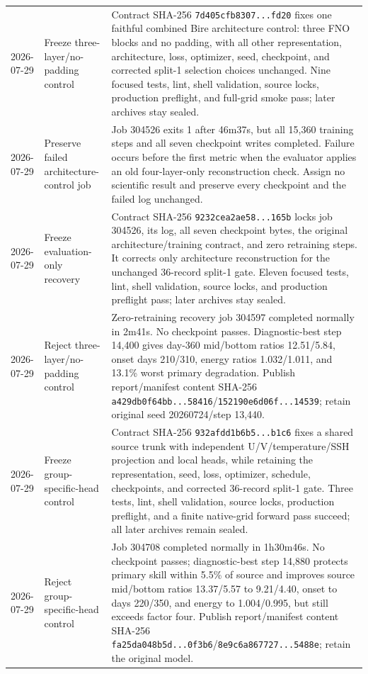 \documentclass[11pt]{article}
\begin{document}
\begin{longtable}{@{}p{}p{}p{}@{}}
2026-07-29 & Freeze three-layer/no-padding control & Contract SHA-256 \texttt{7d405cfb8307...fd20} fixes one faithful combined Bire architecture control: three FNO blocks and no padding, with all other representation, architecture, loss, optimizer, seed, checkpoint, and corrected split-1 selection choices unchanged.  Nine focused tests, lint, shell validation, source locks, production preflight, and full-grid smoke pass; later archives stay sealed. \\
2026-07-29 & Preserve failed architecture-control job & Job 304526 exits 1 after 46m37s, but all 15,360 training steps and all seven checkpoint writes completed.  Failure occurs before the first metric when the evaluator applies an old four-layer-only reconstruction check.  Assign no scientific result and preserve every checkpoint and the failed log unchanged. \\
2026-07-29 & Freeze evaluation-only recovery & Contract SHA-256 \texttt{9232cea2ae58...165b} locks job 304526, its log, all seven checkpoint bytes, the original architecture/training contract, and zero retraining steps.  It corrects only architecture reconstruction for the unchanged 36-record split-1 gate.  Eleven focused tests, lint, shell validation, source locks, and production preflight pass; later archives stay sealed. \\
2026-07-29 & Reject three-layer/no-padding control & Zero-retraining recovery job 304597 completed normally in 2m41s.  No checkpoint passes.  Diagnostic-best step 14,400 gives day-360 mid/bottom ratios 12.51/5.84, onset days 210/310, energy ratios 1.032/1.011, and 13.1\% worst primary degradation.  Publish report/manifest content SHA-256 \texttt{a429db0f64bb...58416}/\texttt{152190e6d06f...14539}; retain original seed 20260724/step 13,440. \\
2026-07-29 & Freeze group-specific-head control & Contract SHA-256 \texttt{932afdd1b6b5...b1c6} fixes a shared source trunk with independent U/V/temperature/SSH projection and local heads, while retaining the representation, seed, loss, optimizer, schedule, checkpoints, and corrected 36-record split-1 gate.  Three tests, lint, shell validation, source locks, production preflight, and a finite native-grid forward pass succeed; all later archives remain sealed. \\
2026-07-29 & Reject group-specific-head control & Job 304708 completed normally in 1h30m46s.  No checkpoint passes; diagnostic-best step 14,880 protects primary skill within 5.5\% of source and improves source mid/bottom ratios 13.37/5.57 to 9.21/4.40, onset to days 220/350, and energy to 1.004/0.995, but still exceeds factor four.  Publish report/manifest content SHA-256 \texttt{fa25da048b5d...0f3b6}/\texttt{8e9c6a867727...5488e}; retain the original model. \\

\end{longtable}
\end{document}
